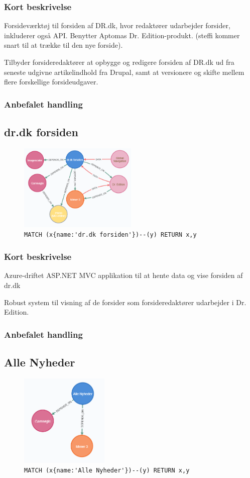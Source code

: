 \documentclass{article}
\begin{document}
\subsubsection*{Kort beskrivelse}
Forsideværktøj til forsiden af DR.dk, hvor redaktører udarbejder forsider, inkluderer også API. Benytter Aptomas Dr. Edition-produkt. (steffi kommer snart til at trække til den nye forside). 

Tilbyder forsideredaktører at opbygge og redigere forsiden af DR.dk ud fra seneste udgivne artikelindhold fra Drupal, samt at versionere og skifte mellem flere forskellige forsideudgaver.
\subsubsection*{Anbefalet handling}



\subsection{dr.dk forsiden}
\begin{figure}[H]
\includegraphics[width=160pt]{DrDkForsiden.PNG}
\cprotect\caption{\verb|MATCH (x{name:'dr.dk forsiden'})--(y) RETURN x,y|}
\end{figure}
\subsubsection*{Kort beskrivelse}
Azure-driftet ASP.NET MVC applikation til at hente data og vise forsiden af dr.dk

Robust system til visning af de forsider som forsideredaktører udarbejder i Dr. Edition.
\subsubsection*{Anbefalet handling}



\subsection{Alle Nyheder}
\begin{figure}[H]
\includegraphics[width=120pt]{AlleNyheder.PNG}
\cprotect\caption{\verb|MATCH (x{name:'Alle Nyheder'})--(y) RETURN x,y|}
\end{figure}
\end{document}
